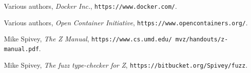\documentclass[a4paper,twoside,12pt]{article}
\begin{document}
\newpage
\begin{flushleft}
\begin{thebibliography}{99}
\label{sec:references}


  Various authors,
  \emph{Docker Inc.},
  \texttt{https://www.docker.com/}.

  Various authors,
  \emph{Open Container Initiative},
  \texttt{https://www.opencontainers.org/}.

  Mike Spivey,
  \emph{The Z Manual},
  \texttt{https://www.cs.umd.edu/ mvz/handouts/z-manual.pdf}.

  Mike Spivey,
  \emph{The fuzz type-checker for Z},
  \texttt{https://bitbucket.org/Spivey/fuzz}.


\end{thebibliography}
\end{flushleft}

\newpage

\end{document}
